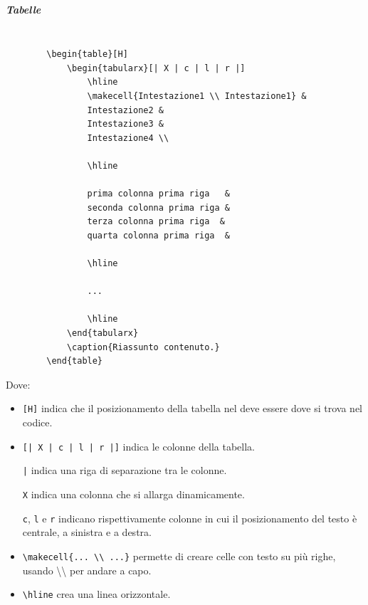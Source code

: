 \subparagraph{Tabelle}
\label{subpar:tabelle}
\begin{lstlisting}

        \begin{table}[H]
            \begin{tabularx}[| X | c | l | r |]
                \hline
                \makecell{Intestazione1 \\ Intestazione1} &
                Intestazione2 &
                Intestazione3 &
                Intestazione4 \\

                \hline

                prima colonna prima riga   &
                seconda colonna prima riga &
                terza colonna prima riga  &
                quarta colonna prima riga  &

                \hline

                ...

                \hline
            \end{tabularx}
            \caption{Riassunto contenuto.}
        \end{table}
\end{lstlisting}
Dove:
\begin{itemize}
    \item \lstinline+[H]+ indica che il posizionamento della tabella nel  deve essere dove si trova nel codice.
    
    \item \lstinline+[| X | c | l | r |]+ indica le colonne della tabella.

    \lstinline+|+ indica una riga di separazione tra le colonne.

    \lstinline+X+ indica una colonna che si allarga dinamicamente.

    \lstinline+c+, \lstinline+l+ e \lstinline+r+ indicano rispettivamente colonne in cui il posizionamento del testo è centrale, a sinistra e a destra.
    
    \item \lstinline+\makecell{... \\ ...}+ permette di creare celle con testo su più righe, usando \textbackslash\textbackslash{} per andare a capo. 

    \item \lstinline+\hline+ crea una linea orizzontale.
\end{itemize}

